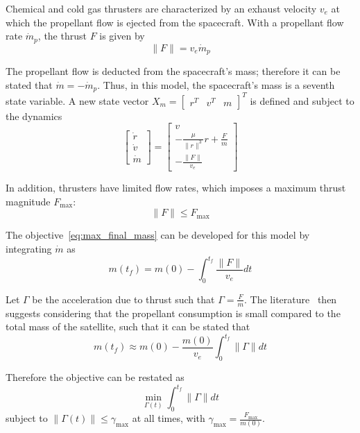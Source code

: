 Chemical and cold gas thrusters are characterized by an exhaust velocity \(v_e\) at which the propellant flow is ejected from the spacecraft. With a propellant flow rate \(\dot m_p\), the thrust \(F\) is given by
\begin{equation}
   \lVert F \rVert = v_e \dot m_p
\end{equation}

The propellant flow is deducted from the spacecraft's mass; therefore it can be stated that \(\dot m = - \dot m_p\). Thus, in this model, the spacecraft's mass is a seventh state variable. A new state vector \(X_m = \begin{bmatrix}
    r^T & v^T & m 
\end{bmatrix}^T\) is defined and subject to the dynamics
\begin{equation}
    \begin{bmatrix}
        \dot r \\ \dot v \\ \dot m
    \end{bmatrix} = \begin{bmatrix}
        v \\ -\frac{\mu}{\lVert r \rVert^3}r + \frac{F}{m} \\ -\frac{\lVert F \rVert}{v_e}
    \end{bmatrix}
\end{equation}

In addition, thrusters have limited flow rates, which imposes a maximum thrust magnitude \(F_{\max}\):
\begin{equation}
    \lVert F \rVert \leq F_{\max}
\end{equation}

The objective~\eqref{eq:max_final_mass} can be developed for this model by integrating \(\dot m\) as
\begin{equation}
    m(t_f) = m(0) - \int_0^{t_f} \frac{\lVert F \rVert}{v_e} dt
\end{equation}

Let \(\Gamma\) be the acceleration due to thrust such that \(\Gamma = \frac{F}{m}\). The literature~\cite{Conway_2010} then suggests considering that the propellant consumption is small compared to the total mass of the satellite, such that it can be stated that
\begin{equation}
    m(t_f) \approx m(0) - \frac{m(0)}{v_e}\int_0^{t_f} \lVert \Gamma \rVert dt
\end{equation}

Therefore the objective can be restated as
\begin{equation}\label{eq:obj_continuous_thrust}
    \min_{\Gamma(t)} \int_0^{t_f} \lVert \Gamma \rVert dt
\end{equation}
subject to \(\lVert \Gamma(t) \rVert \leq \gamma_{\max}\) at all times, with \(\gamma_{\max} = \frac{F_{\max}}{m(0)}\).

